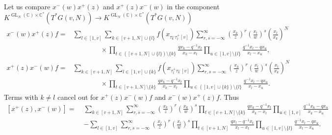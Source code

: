 \documentclass[12pt]{amsart}
\def\Bbb{\mathbb}
\theoremstyle{definition}
\theoremstyle{remark}
\numberwithin{equation}{subsection}
\newcommand{\C}{{\Bbb C}}
\newcommand{\GL}{\operatorname{GL}}
\begin{document}
Let us compare $x^-(w)x^+(z)$ and $x^+(z)x^-(w)$ in the component
$K^{\GL_N(\C)\times\C^*}(T^*G(v,N)) \to
K^{\GL_N(\C)\times\C^*}(T^*G(v,N))$
\begin{equation*}
\begin{split}
  x^-(w)x^+(z) f
  =& \sum_{l\in [1,v]} \sum_{k\in [v+1,N]\cup \{l\}}
  f(x_{\tau_k^-\tau_l^+[v]})
  \sum_{r,s=-\infty}^\infty \left(\frac{x_k}{z}\right)^r
                            \left(\frac{x_l}{w}\right)^s
  \left(\frac{x_l}{x_k}\right)^N
\\
  &\qquad\qquad\times
  \prod_{t\in ([v+1,N]\cup \{l\}) \setminus \{k\}}
     \frac{q x_k - q^{-1} x_t}{x_k - x_t}
  \prod_{u\in [1,v]\setminus\{l\}}
     \frac{q^{-1} x_l - q x_u}{x_l - x_u}, \\
  x^+(z)x^-(w) f
  =& \sum_{k\in [v+1,N]}\sum_{l\in [1,v]\cup\{k\}} 
  f(x_{\tau_l^+\tau_k^-[v]})
  \sum_{r,s=-\infty}^\infty \left(\frac{x_k}{z}\right)^r
                            \left(\frac{x_l}{w}\right)^s
  \left(\frac{x_l}{x_k}\right)^N
\\
  &\qquad\qquad\times
  \prod_{t\in [v+1,N] \setminus \{k\}}
     \frac{q x_k - q^{-1} x_t}{x_k - x_t}
  \prod_{u\in ([1,v]\cup\{k\}) \setminus\{l\}}
    \frac{q^{-1} x_l - q x_u}{x_l - x_u}.
\end{split}
\end{equation*}
Terms with $k\neq l$ cancel out for $x^+(z)x^-(w)f$ and $x^-(w)x^+(z)f$. Thus
\begin{equation*}
\begin{split}
  \left[ x^+(z), x^-(w) \right]
  = \;
   & \sum_{k\in [v+1,N]} 
     \sum_{r,s=-\infty}^\infty \left(\frac{x_k}{z}\right)^r
                               \left(\frac{x_k}{w}\right)^s
\prod_{t\in [v+1,N] \setminus \{k\}}
     \frac{q x_k - q^{-1} x_t}{x_k - x_t}
  \prod_{u\in [1,v]}
    \frac{q^{-1} x_k - q x_u}{x_k - x_u}\\
& - \sum_{l\in [1,v]} 
     \sum_{r,s=-\infty}^\infty \left(\frac{x_l}{z}\right)^r
                               \left(\frac{x_l}{w}\right)^s
\prod_{t\in [v+1,N]}
     \frac{q x_l - q^{-1} x_t}{x_l - x_t}
  \prod_{u\in [1,v]\setminus \{l\}}
    \frac{q^{-1} x_l - q x_u}{x_l - x_u}.
\end{split}
\end{equation*}
\end{document}
